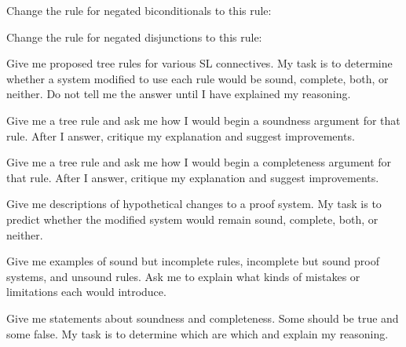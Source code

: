 \begin{earg}
\item Change the rule for negated biconditionals to this rule:


\item Change the rule for negated disjunctions to this rule:

\end{earg}


\begin{genaipractice}

\item Give me proposed tree rules for various SL connectives. My task is to determine whether a system modified to use each rule would be sound, complete, both, or neither. Do not tell me the answer until I have explained my reasoning.

\item Give me a tree rule and ask me how I would begin a soundness argument for that rule. After I answer, critique my explanation and suggest improvements.

\item Give me a tree rule and ask me how I would begin a completeness argument for that rule. After I answer, critique my explanation and suggest improvements.

\item Give me descriptions of hypothetical changes to a proof system. My task is to predict whether the modified system would remain sound, complete, both, or neither.

\item Give me examples of sound but incomplete rules, incomplete but sound proof systems, and unsound rules. Ask me to explain what kinds of mistakes or limitations each would introduce.

\item Give me statements about soundness and completeness. Some should be true and some false. My task is to determine which are which and explain my reasoning.
\end{genaipractice}